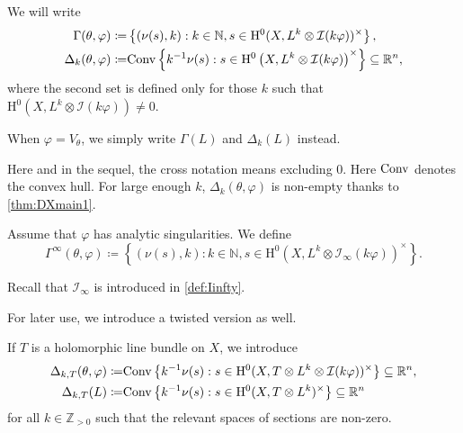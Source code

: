 \begin{definition}\label{def:Okounkov:L484}
    We will write
\[
\begin{aligned}
\Gamma(\theta,\varphi)\coloneqq & \left\{ (\nu(s),k) : k\in \mathbb{N}, s\in \mathrm{H}^0(X,L^k\otimes \mathcal{I}(k\varphi))^{\times} \right\},\\
\Delta_k(\theta,\varphi)\coloneqq & \mathrm{Conv}\left\{ k^{-1}\nu(s): s\in \mathrm{H}^0\left(X,L^k\otimes \mathcal{I}(k\varphi)\right)^{\times} \right\}\subseteq \mathbb{R}^n,
\end{aligned}
\]
\index{$\Gamma(\theta,\varphi)$}
where the second set is defined only for those $k$ such that $\mathrm{H}^0(X,L^k\otimes \mathcal{I}(k\varphi))\neq 0$.

When $\varphi=V_{\theta}$, we simply write $\Gamma(L)$ and $\Delta_k(L)$ instead.
\end{definition}
Here and in the sequel, the cross notation means excluding $0$.
Here $\mathrm{Conv}$ denotes the convex hull. For large enough $k$, $\Delta_k(\theta,\varphi)$ is non-empty thanks to \cref{thm:DXmain1}.

\begin{definition}\label{def:Okounkov:L500}
    Assume that $\varphi$ has analytic singularities.
We define
    \begin{equation}\label{eq:Weps1}
        \Gamma^{\infty}(\theta,\varphi)\coloneqq \left\{ (\nu(s),k):k\in \mathbb{N}, s\in \mathrm{H}^0(X,L^k\otimes \mathcal{I}_{\infty}(k\varphi))^{\times} \right\}.
    \end{equation}\index{$\Gamma^{\infty}(\theta,\varphi)$}
\end{definition}
Recall that $\mathcal{I}_{\infty}$ is introduced in \cref{def:Iinfty}.



For later use, we introduce a twisted version as well.

\begin{definition}\label{def:DeltakT}
If $T$ is a holomorphic line bundle on $X$, we introduce
\[
\begin{aligned}
\Delta_{k,T}(\theta,\varphi)\coloneqq & \mathrm{Conv}\left\{ k^{-1}\nu(s): s\in \mathrm{H}^0(X,T\otimes L^k\otimes \mathcal{I}(k\varphi))^{\times} \right\}\subseteq \mathbb{R}^n,\\
\Delta_{k,T}(L)\coloneqq & \mathrm{Conv}\left\{ k^{-1}\nu(s): s\in \mathrm{H}^0(X,T\otimes L^k)^{\times} \right\}\subseteq \mathbb{R}^n
\end{aligned}
\]
for all $k\in \mathbb{Z}_{>0}$ such that the relevant spaces of sections are non-zero.
\end{definition}



